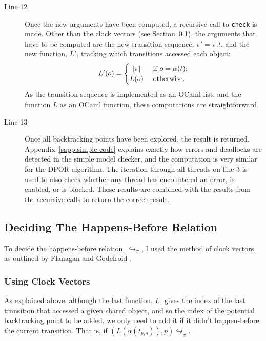 \documentclass[12pt,a4paper,twoside,openright]{report}
\begin{document}
\begin{description}
	\item[Line 12] Once the new arguments have
	been computed, a recursive call to
	\texttt{check} is made. Other than
	the clock vectors (see Section~\ref{sec:clock-vectors}),
	the arguments that
	have to be computed are the new transition
	sequence, $\pi' = \pi.t$,
	and the new function, $L'$,
	tracking which transitions accessed each 
	object:
	\[ L'(o) =
	\begin{cases}
		\hfill |\pi| \hfill & \text{ if } o = \alpha(t); \\
		\hfill L(o) \hfill & \text{ otherwise}.
	\end{cases}\]
	As the transition sequence is implemented as an
	OCaml list, and the function $L$ as an OCaml function,
	these computations are straightforward.

	\item[Line 13] Once all backtracking points have been
	explored, the result is returned.
	Appendix~\ref{sapp:simple-code} explains
	exactly how errors and deadlocks are
	detected in the simple model checker,
	and the computation is very similar
	for the DPOR algorithm. The iteration
	through all threads on line 3 is used
	to also check whether any thread has
	encountered an error, is enabled,
	or is blocked.
	These results are combined with the
	results from the recursive calls to
	return the correct result.

\end{description}

\subsection{Deciding The Happens-Before Relation}
\label{sec:clock-vectors}

To decide the happens-before relation,
$\hookrightarrow_\pi$, I used the method
of clock vectors, as outlined by Flanagan
and Godefroid \cite{flan05}.

\subsubsection{Using Clock Vectors}

As explained above, although
the last function, $L$, gives the index
of the last transition that accessed a given shared
object, and so the index of the potential backtracking
point to be added, we only need to add it if it
didn't happen-before the current transition.
That is, if
$(L(\alpha(t_{p,s})), p)\!\not\hookrightarrow_\pi$.
\end{document}
